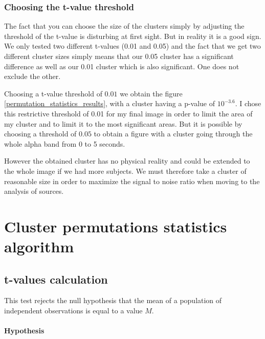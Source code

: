 
\subsubsection{Choosing the t-value threshold}

The fact that you can choose the size of the clusters simply by adjusting the threshold of the t-value is disturbing at first sight. But in reality it is a good sign. We only tested two different t-values (0.01 and 0.05) and the fact that we get two different cluster sizes simply means that our 0.05 cluster has a significant difference as well as our 0.01 cluster which is also significant. One does not exclude the other.

Choosing a t-value threshold of $0.01$ we obtain the figure \ref{permutation_statistics_results}, with a cluster having a p-value of $10^{-3.6}$. I chose this restrictive threshold of 0.01 for my final image in order to limit the area of my cluster and to limit it to the most significant areas. But it is possible by choosing a threshold of $0.05$ to obtain a figure with a cluster going through the whole alpha band from 0 to 5 seconds.

However the obtained cluster has no physical reality and could be extended to the whole image if we had more subjects. We must therefore take a cluster of reasonable size in order to maximize the signal to noise ratio when moving to the analysis of sources.

\section{Cluster permutations statistics algorithm}

\subsection{t-values calculation}

This test rejects the null hypothesis that the mean of a population of independent observations is equal to a value $M$.

\paragraph{Hypothesis}

